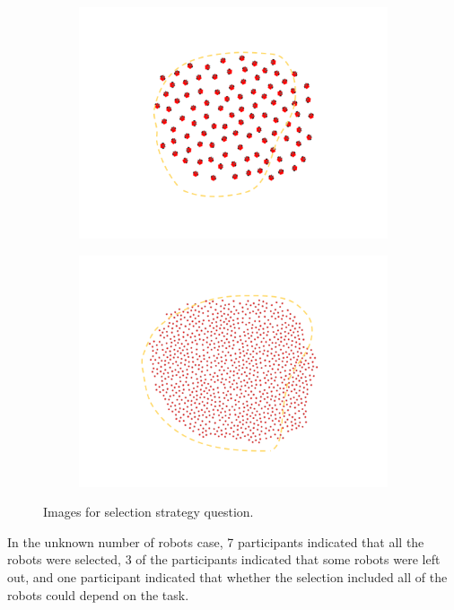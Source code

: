\begin{figure}
\begin{subfigure}{0.48\textwidth}
		\includegraphics[width=\linewidth]{../Selection_Fuzz_100.png}
	\end{subfigure}
 	\begin{subfigure}{0.48\textwidth}
		\includegraphics[width=\linewidth]{../Selection_Fuzz_1000.png}
	\end{subfigure}
		\caption{Images for selection strategy question.}
	\label{strategy_question}
\end{figure}

In the unknown number of robots case, 7 participants indicated that all the robots were selected, 3 of the participants indicated that some robots were left out, and one participant indicated that whether the selection included all of the robots could depend on the task. 

